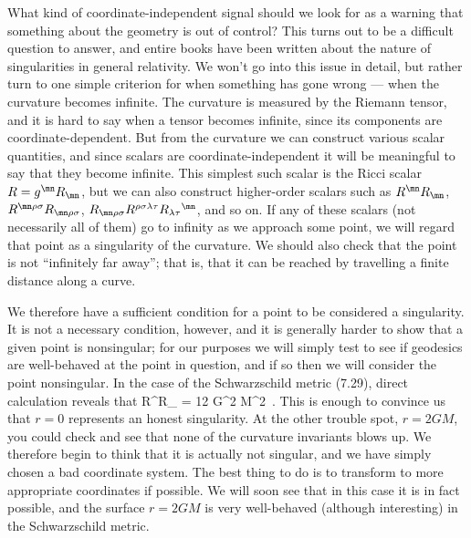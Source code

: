 What kind of coordinate-independent signal should
we look for as a warning that something about the geometry is out of
control?  This turns out to be a difficult question to answer, and
entire books have been written about the nature of singularities in
general relativity.  We won't go into this issue in detail, but
rather turn to one simple criterion for when something has gone wrong ---
when the curvature becomes infinite.  The curvature is measured by
the Riemann tensor, and it is hard to say when a tensor becomes infinite,
since its components are coordinate-dependent.  But from the curvature
we can construct various scalar quantities, and since scalars are
coordinate-independent it will be meaningful to say that they become
infinite.  This simplest such scalar is the Ricci scalar $R=g^\mn R_\mn$,
but we can also construct higher-order scalars such as $R^\mn R_\mn$,
$R^{\mn\rho\sigma}R_{\mn\rho\sigma}$, $R_{\mn\rho\sigma}
R^{\rho\sigma\lambda\tau} R_{\lambda\tau}{}^{\mn}$, and so on.  If any
of these scalars (not necessarily all of them) go to infinity as we
approach some point, we will regard that point as a singularity of the
curvature.  We should also check that the point is not ``infinitely
far away''; that is, that it can be reached by travelling a finite 
distance along a curve.

We therefore have a sufficient condition for a point to be considered
a singularity.  It is not a necessary condition, however, and it is
generally harder to show that a given point is nonsingular; for our 
purposes we will simply test to see if geodesics are well-behaved at 
the point in
question, and if so then we will consider the point nonsingular.
In the case of the Schwarzschild metric (7.29), direct 
calculation reveals that
\be
  R^{\mn\rho\sigma}R_{\mn\rho\sigma} = {{12 G^2 M^2}}\ .
  \label{7.30}
\ee
This is enough to convince us that $r=0$ represents an honest 
singularity.  At the other trouble spot, $r=2GM$, you could check
and see that none of the curvature invariants blows up.  We therefore
begin to think that it is actually not singular, and we have simply
chosen a bad coordinate system.  The best thing to do is to transform
to more appropriate coordinates if possible.  We will soon see that
in this case it is in fact possible, and the surface $r=2GM$ is 
very well-behaved (although interesting) in the Schwarzschild metric.

